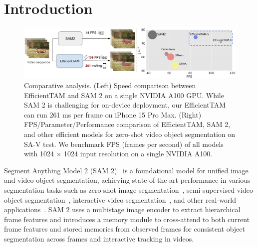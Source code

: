 \section{Introduction}
\label{sec:intro}
\begin{figure}[t]
    \centering
    \includegraphics[width=\linewidth]{figures/intro.png}
    \caption{Comparative analysis. (Left) Speed comparison between EfficientTAM and SAM 2 on a single NVIDIA A100 GPU. While SAM 2 is challenging for on-device deployment, our EfficientTAM can run 261 ms per frame on iPhone 15 Pro Max. (Right) 
    FPS/Parameter/Performance comparison of EfficientTAM, SAM 2, and other efficient models for zero-shot video object segmentation on SA-V test. We benchmark FPS (frames per second) of all models with 1024 × 1024 input resolution on a single NVIDIA A100.}
    \label{fig:throughput}
\end{figure}

Segment Anything Model 2 (SAM 2)~\citep{ravi2024sam} is a foundational model for unified image and video object segmentation, achieving state-of-the-art performance in various segmentation tasks such as zero-shot image segmentation~\citep{kirillov2023segment,chen2023semantic,deng2023segment,chen2023sam}, semi-supervised video object segmentation~\citep{pont20172017,xu2018youtube,oh2019video,bhat2020learning,robinson2020learning,li2022recurrent,yang2022decoupling,cheng2022xmem,zhang2023joint,wang2023look,wu2023scalable,cheng2024putting,yang2024scalable}, interactive video segmentation~\citep{caelles20182018,heo2020interactive,cheng2021modular,homayounfar2021videoclick,yang2023track,cheng2023segment,rajivc2023segment,cheng2024putting,delatolas2024learning}, and other real-world applications~\citep{zhang2024evf,xiong2024sam2,shen2024performance,zhang2024sam2,ding2024sam2long,qiu2024ded,tang2024segment,zhou2024sam2}. SAM 2 uses a multistage image encoder  to extract hierarchical frame features and introduces a memory module to cross-attend to both current frame features and stored memories from observed frames for consistent object segmentation across frames and interactive tracking in videos. 

